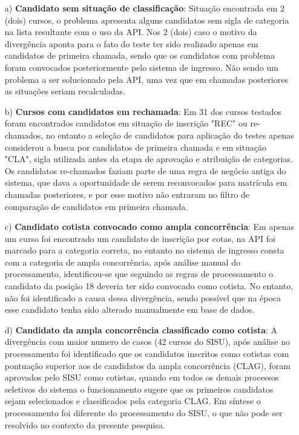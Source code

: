 \begin{enumerate}
    \item[a)] \textbf{Candidato sem situação de classificação}: Situação encontrada em 2 (dois) cursos, o problema apresenta alguns candidatos sem sigla de categoria na lista resultante com o uso da API. Nos 2 (dois) caso o motivo da divergência aponta para o fato do teste ter sido realizado apenas em candidatos de primeira chamada, sendo que os candidatos com problema foram convocados posteriormente pelo sistema de ingresso. Não sendo um problema a ser solucionado pela API, uma vez que em chamadas posteriores as situações seriam recalculadas.
    
    \item[b)] \textbf{Cursos com candidatos em rechamada}: Em 31 dos cursos testados foram encontrados candidatos em situação de inscrição "REC" ou re-chamados, no entanto a seleção de candidatos para aplicação do testes apenas considerou a busca por candidatos de primeira chamada e em situação "CLA", sigla utilizada antes da etapa de aprovação e atribuição de categorias. Os candidatos re-chamados faziam parte de uma regra de negócio antiga do sistema, que dava a oportunidade de serem reconvocados para matrícula em chamadas posteriores, e por esse motivo não entraram no filtro de comparação de candidatos em primeira chamada.
    
    \item[c)] \textbf{Candidato cotista convocado como ampla concorrência}: Em apenas um curso foi encontrado um candidato de inscrição por cotas, na API foi marcado para a categoria correta, no entanto no sistema de ingresso consta com a categoria de ampla concorrência, após análise manual do processamento, identificou-se que seguindo as regras de processamento o candidato da posição 18 deveria ter sido convocado como cotista. No entanto, não foi identificado a causa dessa divergência, sendo possível que na época esse candidato tenha sido alterado manualmente em base de dados.
    
      
    \item[d)] \textbf{Candidato da ampla concorrência classificado como cotista}: A divergência com maior numero de casos (42 cursos do \gls{SISU}), após análise no processamento foi identificado que os candidatos inscritos como cotistas com pontuação superior aos de candidatos da ampla concorrência (CLAG), foram aprovados pelo \gls{SISU} como cotistas, quando em todos os demais processos seletivos do sistema o funcionamento sugere que os primeiros candidatos sejam selecionados e classificados pela categoria CLAG. Em síntese o processamento foi diferente do processamento do SISU, o que não pode ser resolvido no contexto da presente pesquisa.
    
\end{enumerate}

